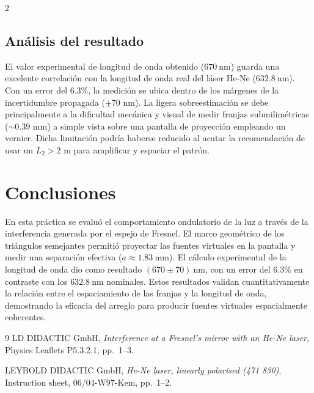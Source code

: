 \documentclass{article}
\begin{document}
\begin{multicols*}{2}
\subsection*{Análisis del resultado}
El valor experimental de longitud de onda obtenido ($670\ \mathrm{nm}$) guarda una excelente correlación con la longitud de onda real del láser He-Ne ($632.8\ \mathrm{nm}$). Con un error del $6.3\%$, la medición se ubica dentro de los márgenes de la incertidumbre propagada ($\pm 70$ nm). La ligera sobreestimación se debe principalmente a la dificultad mecánica y visual de medir franjas submilimétricas ($\sim 0.39$ mm) a simple vista sobre una pantalla de proyección empleando un vernier. Dicha limitación podría haberse reducido al acatar la recomendación de usar un $L_2 > 2$ m para amplificar y espaciar el patrón.

\section*{Conclusiones}
En esta práctica se evaluó el comportamiento ondulatorio de la luz a través de la interferencia generada por el espejo de Fresnel. El marco geométrico de los triángulos semejantes permitió proyectar las fuentes virtuales en la pantalla y medir una separación efectiva ($a \approx 1.83\ \mathrm{mm}$). El cálculo experimental de la longitud de onda dio como resultado $(670\pm70)\ \mathrm{nm}$, con un error del $6.3\%$ en contraste con los $632.8\ \mathrm{nm}$ nominales. Estos resultados validan cuantitativamente la relación entre el espaciamiento de las franjas y la longitud de onda, demostrando la eficacia del arreglo para producir fuentes virtuales espacialmente coherentes.

\begingroup
{}
\begin{thebibliography}{9}
LD DIDACTIC GmbH,
\emph{Interference at a Fresnel's mirror with an He-Ne laser},
Physics Leaflets P5.3.2.1, pp.~1--3.

LEYBOLD DIDACTIC GmbH,
\emph{He-Ne laser, linearly polarised (471 830)},
Instruction sheet, 06/04-W97-Kem, pp.~1--2.
\end{thebibliography}
\endgroup
\end{multicols*}
\end{document}
